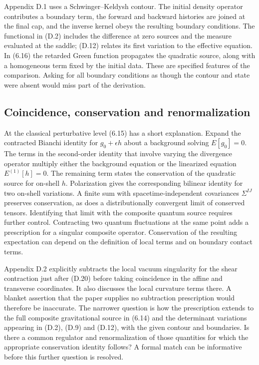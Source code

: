 \documentclass[11pt]{article}
\begin{document}
Appendix D.1 uses a Schwinger--Keldysh contour. The initial density operator contributes a boundary term, the forward and backward histories are joined at the final cap, and the inverse kernel obeys the resulting boundary conditions. The functional in (D.2) includes the difference at zero sources and the measure evaluated at the saddle; (D.12) relates its first variation to the effective equation. In (6.16) the retarded Green function propagates the quadratic source, along with a homogeneous term fixed by the initial data. These are specified features of the comparison. Asking for all boundary conditions as though the contour and state were absent would miss part of the derivation.

\subsection{Coincidence, conservation and renormalization}
At the classical perturbative level (6.15) has a short explanation. Expand the contracted Bianchi identity for $g_0+\epsilon h$ about a background solving $E[g_0]=0$. The terms in the second-order identity that involve varying the divergence operator multiply either the background equation or the linearized equation $E^{(1)}[h]=0$. The remaining term states the conservation of the quadratic source for on-shell $h$. Polarization gives the corresponding bilinear identity for two on-shell variations. A finite sum with spacetime-independent covariances $\Sigma^{IJ}$ preserves conservation, as does a distributionally convergent limit of conserved tensors. Identifying that limit with the composite quantum source requires further control. Contracting two quantum fluctuations at the same point adds a prescription for a singular composite operator. Conservation of the resulting expectation can depend on the definition of local terms and on boundary contact terms.

Appendix D.2 explicitly subtracts the local vacuum singularity for the shear contraction just after (D.20) before taking coincidence in the affine and transverse coordinates. It also discusses the local curvature terms there. A blanket assertion that the paper supplies no subtraction prescription would therefore be inaccurate. The narrower question is how the prescription extends to the full composite gravitational source in (6.14) and the determinant variations appearing in (D.2), (D.9) and (D.12), with the given contour and boundaries. Is there a common regulator and renormalization of those quantities for which the appropriate conservation identity follows? A formal match can be informative before this further question is resolved.
\end{document}
